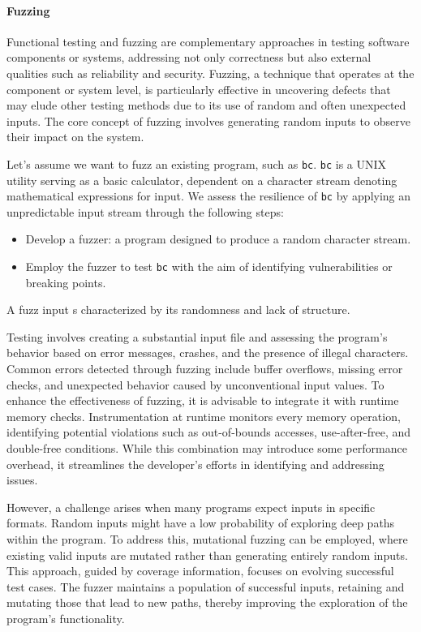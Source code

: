 \paragraph*{Fuzzing}
Functional testing and fuzzing are complementary approaches in testing software components or systems, addressing not only correctness but also external qualities such as reliability and security.
Fuzzing, a technique that operates at the component or system level, is particularly effective in uncovering defects that may elude other testing methods due to its use of random and often unexpected inputs.
The core concept of fuzzing involves generating random inputs to observe their impact on the system. 
\begin{example}
    Let's assume we want to fuzz an existing program, such as \texttt{bc}. 
    \texttt{bc} is a UNIX utility serving as a basic calculator, dependent on a character stream denoting mathematical expressions for input.
    We assess the resilience of \texttt{bc} by applying an unpredictable input stream through the following steps:
    \begin{itemize}
        \item Develop a fuzzer: a program designed to produce a random character stream.
        \item Employ the fuzzer to test \texttt{bc} with the aim of identifying vulnerabilities or breaking points.
    \end{itemize}
\end{example}
\begin{definition}
    A fuzz input s characterized by its randomness and lack of structure. 
\end{definition}
Testing involves creating a substantial input file and assessing the program's behavior based on error messages, crashes, and the presence of illegal characters.
Common errors detected through fuzzing include buffer overflows, missing error checks, and unexpected behavior caused by unconventional input values. 
To enhance the effectiveness of fuzzing, it is advisable to integrate it with runtime memory checks. 
Instrumentation at runtime monitors every memory operation, identifying potential violations such as out-of-bounds accesses, use-after-free, and double-free conditions. 
While this combination may introduce some performance overhead, it streamlines the developer's efforts in identifying and addressing issues.

However, a challenge arises when many programs expect inputs in specific formats. 
Random inputs might have a low probability of exploring deep paths within the program.
To address this, mutational fuzzing can be employed, where existing valid inputs are mutated rather than generating entirely random inputs. 
This approach, guided by coverage information, focuses on evolving successful test cases. 
The fuzzer maintains a population of successful inputs, retaining and mutating those that lead to new paths, thereby improving the exploration of the program's functionality.

